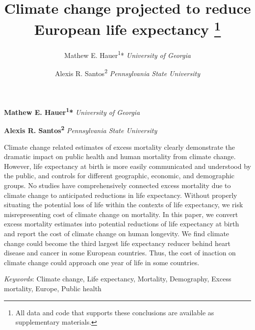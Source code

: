 \documentclass[12pt,]{article}
\title{Climate change projected to reduce European life expectancy \thanks{All data and code that supports these conclusions are available as
supplementary materials.}  }
\author{\Large Mathew E. Hauer\textsuperscript{1}*\vspace{0.05in} \newline\normalsize\emph{University of Georgia}   \and \Large Alexis R. Santos\textsuperscript{2}\vspace{0.05in} \newline\normalsize\emph{Pennsylvania State University}  }
\date{}
\newcommand*{\authorfont}{\fontfamily{phv}\selectfont}
\renewenvironment{abstract}
 {{%
    \setlength{\leftmargin}{0mm}
    \setlength{\rightmargin}{\leftmargin}%
  }%
  \relax}
 {\endlist}
\begin{document}
	
%

{%
\setlength{\parindent}{0pt}
\thispagestyle{plain}
{\fontsize{18}{20}\selectfont\raggedright 
\maketitle  %

}

{
   \vskip 13.5pt\relax \normalsize\fontsize{11}{12} 
\textbf{\authorfont Mathew E. Hauer\textsuperscript{1}*} \hskip 15pt \emph{\small University of Georgia}   \par \textbf{\authorfont Alexis R. Santos\textsuperscript{2}} \hskip 15pt \emph{\small Pennsylvania State University}   

}

}








\begin{abstract}

    \hbox{\vrule height .2pt width 39.14pc}

    \vskip 8.5pt %

\noindent Climate change related estimates of excess mortality clearly demonstrate
the dramatic impact on public health and human mortality from climate
change. However, life expectancy at birth is more easily communicated
and understood by the public, and controls for different geographic,
economic, and demographic groups. No studies have comprehensively
connected excess mortality due to climate change to anticipated
reductions in life expectancy. Without properly situating the potential
loss of life within the contexts of life expectancy, we risk
misrepresenting cost of climate change on mortality. In this paper, we
convert excess mortality estimates into potential reductions of life
expectancy at birth and report the cost of climate change on human
longevity. We find climate change could become the third largest life
expectancy reducer behind heart disease and cancer in some European
countries. Thus, the cost of inaction on climate change could approach
one year of life in some countries.


\vskip 8.5pt \noindent \emph{Keywords}: Climate change, Life expectancy, Mortality, Demography, Excess
mortality, Europe, Public health \par

    \hbox{\vrule height .2pt width 39.14pc}



\end{abstract}
\end{document}
